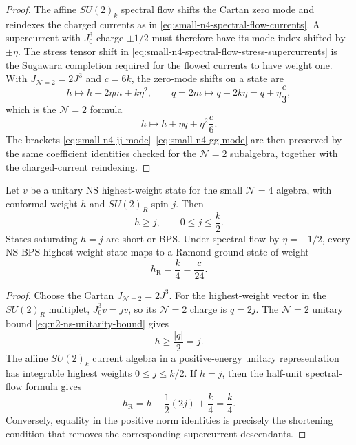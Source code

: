 \begin{proof}
The affine \(SU(2)_k\) spectral flow shifts the Cartan zero mode and reindexes
the charged currents as in
\eqref{eq:small-n4-spectral-flow-currents}.  A supercurrent with \(J^3_0\)
charge \(\pm1/2\) must therefore have its mode index shifted by
\(\pm\eta\).  The stress tensor shift in
\eqref{eq:small-n4-spectral-flow-stress-supercurrents} is the Sugawara
completion required for the flowed currents to have weight one.  With
\(J_{\mathcal N=2}=2J^3\) and \(c=6k\), the zero-mode shifts on a state are
\[
  h\mapsto h+2\eta m+k\eta^2,
  \qquad
  q=2m\mapsto q+2k\eta=q+\eta\frac c3,
\]
which is the \(\mathcal N=2\) formula
\[
  h\mapsto h+\eta q+\eta^2\frac c6.
\]
The brackets \eqref{eq:small-n4-jj-mode}--\eqref{eq:small-n4-gg-mode} are
then preserved by the same coefficient identities checked for the
\(\mathcal N=2\) subalgebra, together with the charged-current reindexing.
\end{proof}

\begin{proposition}
\label{prop:small-n4-unitary-bps-bound}
Let \(v\) be a unitary NS highest-weight state for the small
\(\mathcal N=4\) algebra, with conformal weight \(h\) and \(SU(2)_R\) spin
\(j\).  Then
\begin{equation}
  h\ge j,
  \qquad
  0\le j\le \frac k2.
  \label{eq:small-n4-ns-bps-bound}
\end{equation}
States saturating \(h=j\) are short or BPS.  Under spectral flow by
\(\eta=-1/2\), every NS BPS highest-weight state maps to a Ramond ground state
of weight
\begin{equation}
  h_{\mathrm R}=\frac{k}{4}=\frac c{24}.
  \label{eq:small-n4-ramond-ground-weight}
\end{equation}
\end{proposition}

\begin{proof}
Choose the Cartan \(J_{\mathcal N=2}=2J^3\).  For the highest-weight vector in
the \(SU(2)_R\) multiplet, \(J^3_0v=jv\), so its \(\mathcal N=2\) charge is
\(q=2j\).  The \(\mathcal N=2\) unitary bound
\eqref{eq:n2-ns-unitarity-bound} gives
\[
  h\ge\frac{|q|}{2}=j .
\]
The affine \(SU(2)_k\) current algebra in a positive-energy unitary
representation has integrable highest weights \(0\le j\le k/2\).  If
\(h=j\), then the half-unit spectral-flow formula gives
\[
  h_{\mathrm R}=h-\frac12(2j)+\frac{k}{4}=\frac{k}{4}.
\]
Conversely, equality in the positive norm identities is precisely the
shortening condition that removes the corresponding supercurrent descendants.
\end{proof}

